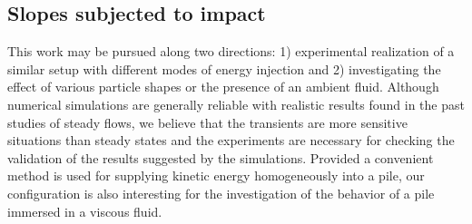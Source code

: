 \subsection{Slopes subjected to impact}
This work may be pursued along two directions: 1) experimental realization of a 
similar setup with different modes of energy injection and 2) investigating the 
effect of various particle shapes or the presence of an ambient fluid. Although 
numerical simulations are generally reliable with realistic results found in 
the past studies of steady flows, we believe that the transients are more 
sensitive situations than steady states and the  experiments are necessary for 
checking the validation of the results suggested by the simulations. Provided a 
convenient method is used for supplying kinetic energy homogeneously into a 
pile, our configuration is also interesting for the investigation of the 
behavior of a pile immersed in a viscous fluid.